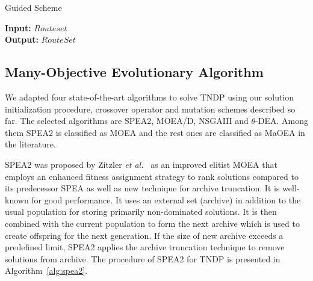\begin{algorithm}[!htbp]
	\caption{Guided Scheme}
	\textbf{Input:} $Routeset$\\
	\textbf{Output:} $RouteSet$
	\begin{algorithmic}[1]\label{alg:guided_scheme}
		\ELSE
		\ENDIF
	\end{algorithmic}
\end{algorithm}

\subsection{Many-Objective Evolutionary Algorithm}

We adapted four state-of-the-art algorithms to solve TNDP using our solution initialization procedure, crossover operator and mutation schemes described so far. The selected algorithms are SPEA2, MOEA/D, NSGAIII and $\theta$-DEA. Among them SPEA2 is classified as MOEA and the rest ones are classified as MaOEA in the literature.

SPEA2 was proposed by Zitzler \textit{et al.}~\cite{zitzler2001spea2} as an improved elitist MOEA that employs an enhanced fitness assignment strategy to rank solutions compared to its predecessor SPEA as well as new technique for archive truncation. It is well-known for good performance. It uses an external set (archive) in addition to the usual population for storing primarily non-dominated solutions. It is then combined with the current population to form the next archive which is used to create offspring for the next generation. If the size of new archive exceeds a predefined limit, SPEA2 applies the archive truncation technique to remove solutions from archive.
The procedure of SPEA2 for TNDP is presented in Algorithm~\ref{alg:spea2}.

